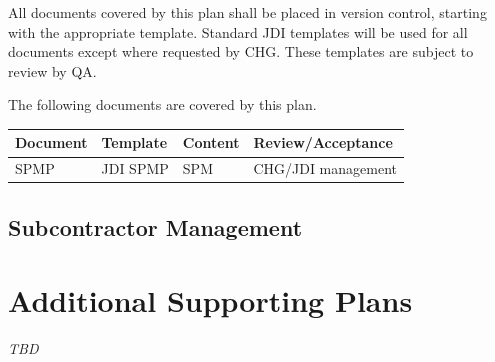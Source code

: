 \documentclass[11pt]{article}
\begin{document}
All documents covered by this plan shall be placed in version control, starting with the appropriate
template.  Standard JDI templates will be used for all documents except where requested by CHG.
These templates are subject to review by QA.

The following documents are covered by this plan.

\begin{tabular}{llll}
  \bf Document & \bf Template & \bf Content & \bf Review/Acceptance \\
  \hline \hline
  SPMP & JDI SPMP & SPM & CHG/JDI management
\end{tabular}



\subsection{Subcontractor Management}




\section{Additional Supporting Plans}
\textit{TBD}




\end{document}
